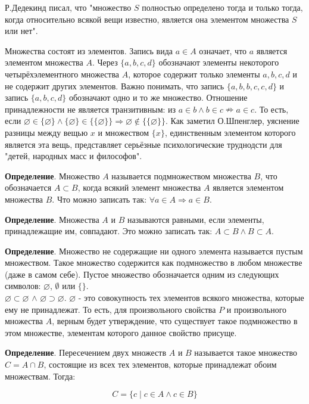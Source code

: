 \documentclass[a4paper]{book}
\begin{document}
Р.Дедекинд писал, что "множество $S$ полностью определено тогда и только тогда, когда относительно всякой вещи известно, является она элементом множества $S$ или нет".

Множества состоят из элементов. Запись вида $a\in A$ означает, что $a$ является элементом множества $A$. Через $\{a,b,c,d\}$ обозначают элементы некоторого четырёхэлементного множества $A$, которое содержит только элементы $a,b,c,d$ и не содержит других элементов. Важно понимать, что запись $\{a,b,b,c,c,d\}$ и запись $\{a,b,c,d\}$ обозначают одно и то же множество. Отношение принадлежности не является транзитивным: из $a \in b \wedge b \in c \nRightarrow a \in c$. То есть, если $\varnothing \in \{\varnothing\} \wedge \{\varnothing\} \in \{\{\varnothing\}\} \Rightarrow \varnothing \notin \{\{\varnothing\}\}$. Как заметил О.Шпенглер, уяснение разницы между вещью $x$ и множеством $\{x\}$, единственным элементом которого является эта вещь, представляет серьёзные психологические труднодсти для "детей, народных масс и философов". 

\textbf{Определение}. Множество $A$ называется подмножеством множества $B$, что обозначается $A\subset B$, когда всякий элемент множества $A$ является элементом множества $B$. Что можно записать так: $\forall a \in A \Rightarrow a \in B$.

\textbf{Определение}. Множества $A$ и $B$ называются равными, если элементы, принадлежащие им, совпадают. Это можно записать так: $A\subset B \wedge B\subset A$. 

\textbf{Определение}. Множество не содержащие ни одного элемента называется пустым множеством. Такое множество содержится как подмножество в любом множестве (даже в самом себе). Пустое множество обозначается одним из следующих символов: $\varnothing$, $\emptyset$ или $\{\}$. 
\\$\varnothing\subset\varnothing$ $\wedge$ $\varnothing \supset \varnothing$. $\varnothing$ - это совокупность тех элементов всякого множества, которые ему не принадлежат. То есть, для произвольного свойства $P$ и произвольного множества $A$, верным будет утверждение, что существует такое подмножество в этом множестве, элементам которого данное свойство присуще. 

\textbf{Определение}. Пересечением двух множеств $A$ и $B$ называется такое множество $C = A\cap B$, состоящие из всех тех элементов, которые принадлежат обоим множествам. Тогда: 

\begin{equation}
C = \{c \mid c\in A \wedge c\in B\}
\end{equation} 
\end{document}
